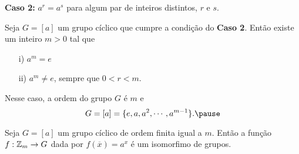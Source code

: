 \documentclass{beamer}
\begin{document}
    \begin{frame}
        \textbf{Caso 2:} $a^r = a^s$ \pause para algum par de inteiros distintos, $r$ e $s$. \pause
    \end{frame}

    \begin{frame}
        \begin{proposicao}
            Seja $G = [a]$ um grupo cíclico que cumpre a condição do \textbf{Caso 2}. \pause Então existe um inteiro $m > 0$ tal que \pause
            \begin{enumerate}
                \item[i)] $a^m = e$ \pause

                \item[ii)] $a^m \ne e$, sempre que $0 < r < m$. \pause
            \end{enumerate}
            Nesse caso, a ordem do grupo $G$ é $m$ \pause e
            \[
                G = [a] = \{e, a, a^2, \cdots, a^{m - 1}\}. \pause
            \]
        \end{proposicao}
    \end{frame}

    \begin{frame}
        \begin{corolario}
            Seja $G = [a]$ um grupo cíclico de ordem finita igual a $m$. \pause Então a função $f : \mathbb{Z}_m \to G$ \pause dada por $f(\overline{x}) = a^x$ \pause é um isomorfimo de grupos.
        \end{corolario}
    \end{frame}
\end{document}

